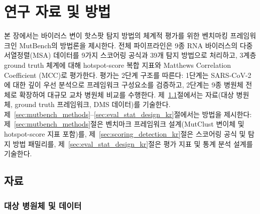 \chapter{연구 자료 및 방법}
\label{ch:mutbench}

본 장에서는 바이러스 변이 핫스팟 탐지 방법의 체계적 평가를 위한 벤치마킹 프레임워크인 MutBench의 방법론을 제시한다.
전체 파이프라인은 9종 RNA 바이러스의 다중서열정렬(MSA) 데이터를 9가지 스코어링 공식과 39개 탐지 방법으로 처리하고, 3계층 ground truth 체계에 대해 hotspot-score 복합 지표와 Matthews Correlation Coefficient (MCC)로 평가한다.
평가는 2단계 구조를 따른다: 1단계는 SARS-CoV-2에 대한 깊이 우선 분석으로 프레임워크 구성요소를 검증하고, 2단계는 9종 병원체 전체로 확장하여 대규모 교차 병원체 비교를 수행한다.
제~\ref{sec:mutbench_materials}절에서는 자료(대상 병원체, ground truth 프레임워크, DMS 데이터)를 기술한다. 제~\ref{sec:mutbench_methods}--\ref{sec:eval_stat_design_kr}절에서는 방법을 제시한다: 제~\ref{sec:mutbench_methods}절은 벤치마크 프레임워크 설계(MutClust 변이체 및 hotspot-score 지표 포함)를, 제~\ref{sec:scoring_detection_kr}절은 스코어링 공식 및 탐지 방법 패밀리를, 제~\ref{sec:eval_stat_design_kr}절은 평가 지표 및 통계 분석 설계를 기술한다.
\label{sec:9pathogen_benchmark}

\section{자료}
\label{sec:mutbench_materials}

\subsection{대상 병원체 및 데이터}
\label{subsec:9pathogen_data}

